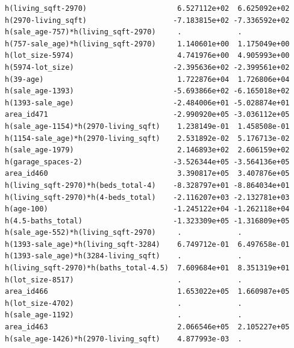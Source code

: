 \documentclass[
]{article}
\begin{document}
\begin{verbatim}
h(living_sqft-2970)                     6.527112e+02  6.625092e+02
h(2970-living_sqft)                    -7.183815e+02 -7.336592e+02
h(sale_age-757)*h(living_sqft-2970)     .             .           
h(757-sale_age)*h(living_sqft-2970)     1.140601e+00  1.175049e+00
h(lot_size-5974)                        4.741976e+00  4.905993e+00
h(5974-lot_size)                       -2.395636e+02 -2.399561e+02
h(39-age)                               1.722876e+04  1.726806e+04
h(sale_age-1393)                       -5.693866e+02 -6.165018e+02
h(1393-sale_age)                       -2.484006e+01 -5.028874e+01
area_id471                             -2.990920e+05 -3.036112e+05
h(sale_age-1154)*h(2970-living_sqft)    1.238149e-01  1.458508e-01
h(1154-sale_age)*h(2970-living_sqft)    2.531892e-02  5.176713e-02
h(sale_age-1979)                        2.146893e+02  2.606159e+02
h(garage_spaces-2)                     -3.526344e+05 -3.564136e+05
area_id460                              3.390817e+05  3.407876e+05
h(living_sqft-2970)*h(beds_total-4)    -8.328797e+01 -8.864034e+01
h(living_sqft-2970)*h(4-beds_total)    -2.116207e+03 -2.132781e+03
h(age-100)                             -1.245122e+04 -1.262118e+04
h(4.5-baths_total)                     -1.323309e+05 -1.316809e+05
h(sale_age-552)*h(living_sqft-2970)     .             .           
h(1393-sale_age)*h(living_sqft-3284)    6.749712e-01  6.497658e-01
h(1393-sale_age)*h(3284-living_sqft)    .             .           
h(living_sqft-2970)*h(baths_total-4.5)  7.609684e+01  8.351319e+01
h(lot_size-8517)                        .             .           
area_id466                              1.653022e+05  1.660987e+05
h(lot_size-4702)                        .             .           
h(sale_age-1192)                        .             .           
area_id463                              2.066546e+05  2.105227e+05
h(sale_age-1426)*h(2970-living_sqft)    4.877993e-03  .           
                                                                  

\end{verbatim}
\end{document}
